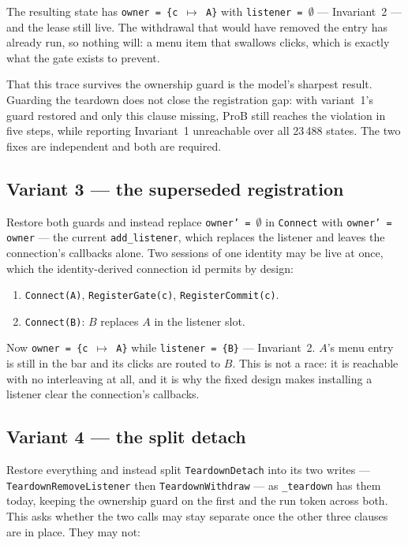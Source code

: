 \documentclass[a4paper,10pt,fleqn]{article}
\begin{document}
The resulting state has \texttt{owner = \{c $\mapsto$ A\}} with
\texttt{listener = $\emptyset$} --- Invariant~2 --- and the lease still
live.  The withdrawal that would have removed the entry has already
run, so nothing will: a menu item that swallows clicks, which is
exactly what the gate exists to prevent.

That this trace survives the ownership guard is the model's sharpest
result.  Guarding the teardown does not close the registration gap: with
variant~1's guard restored and only this clause missing, ProB still
reaches the violation in five steps, while reporting Invariant~1
unreachable over all 23\,488 states.  The two fixes are independent and
both are required.

\subsection*{Variant 3 --- the superseded registration}

Restore both guards and instead replace \texttt{owner' = $\emptyset$} in
\texttt{Connect} with \texttt{owner' = owner} --- the current
\texttt{add\_listener}, which replaces the listener and leaves the
connection's callbacks alone.  Two sessions of one identity may be live
at once, which the identity-derived connection id permits by design:

\begin{enumerate}
  \item \texttt{Connect(A)}, \texttt{RegisterGate(c)},
    \texttt{RegisterCommit(c)}.
  \item \texttt{Connect(B)}: $B$ replaces $A$ in the listener slot.
\end{enumerate}

Now \texttt{owner = \{c $\mapsto$ A\}} while \texttt{listener = \{B\}}
--- Invariant~2.  $A$'s menu entry is still in the bar and its clicks
are routed to $B$.  This is not a race: it is reachable with no
interleaving at all, and it is why the fixed design makes installing a
listener clear the connection's callbacks.

\subsection*{Variant 4 --- the split detach}

Restore everything and instead split \texttt{TeardownDetach} into its
two writes --- \texttt{TeardownRemoveListener} then
\texttt{TeardownWithdraw} --- as \texttt{\_teardown} has them today,
keeping the ownership guard on the first and the run token across both.
This asks whether the two calls may stay separate once the other three
clauses are in place.  They may not:
\end{document}
